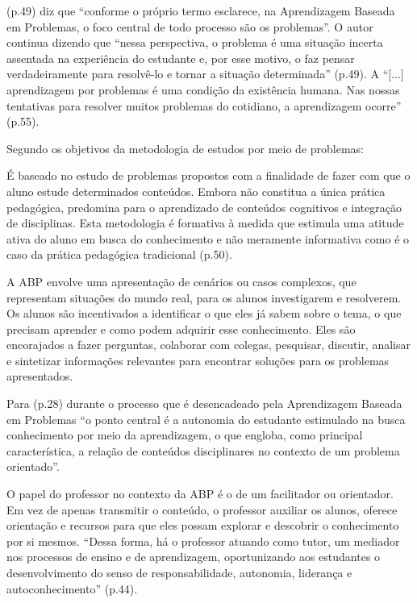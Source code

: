  (p.49) diz que ``conforme o próprio termo esclarece, na Aprendizagem Baseada em Problemas, o foco central de todo processo são os problemas''. O autor continua dizendo que ``nessa perspectiva, o problema é uma situação incerta assentada na experiência do estudante e, por esse motivo, o faz pensar verdadeiramente para resolvê-lo e tornar a situação determinada'' (p.49). A ``[...] aprendizagem por problemas é uma condição da existência humana. Nas nossas tentativas para resolver muitos problemas do cotidiano, a aprendizagem ocorre'' \cite{SOUZA2016} (p.55).

Segundo  os objetivos da metodologia de estudos por meio de problemas:

\begin{citacao}
    É baseado no estudo de problemas propostos com a finalidade de fazer com que o aluno estude determinados conteúdos. Embora não constitua a única prática pedagógica, predomina para o aprendizado de conteúdos cognitivos e integração de disciplinas. Esta metodologia é formativa à medida que estimula uma atitude ativa do aluno em busca do conhecimento e não meramente informativa como é o caso da prática pedagógica tradicional \cite{TANGERINO2017} (p.50).
\end{citacao}

A ABP envolve uma apresentação de cenários ou casos complexos, que representam situações do mundo real, para os alunos investigarem e resolverem. Os alunos são incentivados a identificar o que eles já sabem sobre o tema, o que precisam aprender e como podem adquirir esse conhecimento. Eles são encorajados a fazer perguntas, colaborar com colegas, pesquisar, discutir, analisar e sintetizar informações relevantes para encontrar soluções para os problemas apresentados.

Para  (p.28) durante o processo que é desencadeado pela Aprendizagem Baseada em Problemas ``o ponto central é a autonomia do estudante estimulado na busca conhecimento por meio da aprendizagem, o que engloba, como principal característica, a relação de conteúdos disciplinares no contexto de um problema orientado''.

O papel do professor no contexto da ABP é o de um facilitador ou orientador. Em vez de apenas transmitir o conteúdo, o professor auxiliar os alunos, oferece orientação e recursos para que eles possam explorar e descobrir o conhecimento por si mesmos. ``Dessa forma, há o professor atuando como tutor, um mediador nos processos de ensino e de aprendizagem, oportunizando aos estudantes o desenvolvimento do senso de responsabilidade, autonomia, liderança e autoconhecimento'' \cite{NUNES2022} (p.44).


